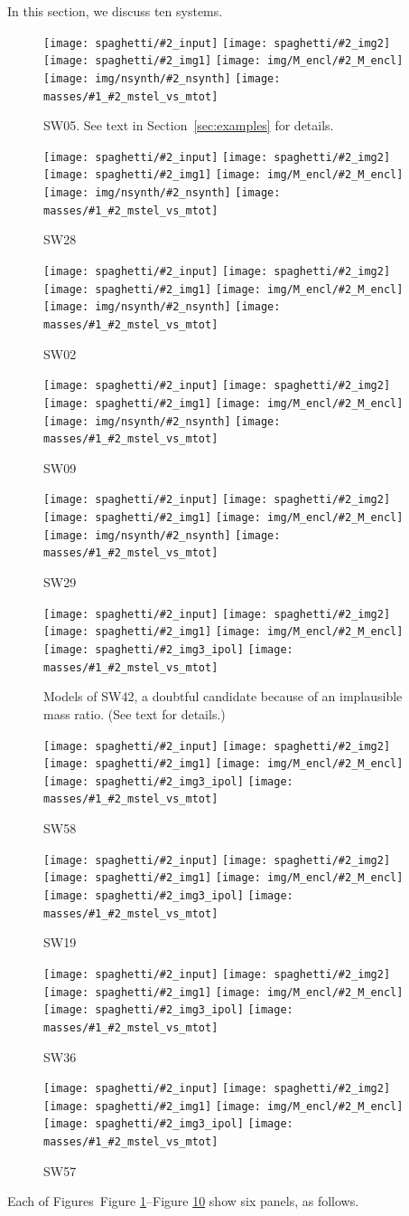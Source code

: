 \documentclass[fleqn,usenatbib]{mnras}
\newcommand{\inclfig}[2]{
  \centering
	\texttt{[image: spaghetti/\#2\_input]}%
	\texttt{[image: spaghetti/\#2\_img2]}
	\texttt{[image: spaghetti/\#2\_img1]}%
	\texttt{[image: img/M\_encl/\#2\_M\_encl]}
	\texttt{[image: spaghetti/\#2\_img3\_ipol]}%
	\texttt{[image: masses/\#1\_\#2\_mstel\_vs\_mtot]}
}
\newcommand{\inclfign}[2]{
  \centering
	\texttt{[image: spaghetti/\#2\_input]}%
	\texttt{[image: spaghetti/\#2\_img2]}
	\texttt{[image: spaghetti/\#2\_img1]}%
	\texttt{[image: img/M\_encl/\#2\_M\_encl]}
	\texttt{[image: img/nsynth/\#2\_nsynth]}%
	\texttt{[image: masses/\#1\_\#2\_mstel\_vs\_mtot]}
}
\newcommand{\figref}[1]{Figure \ref{fig:#1}}
\begin{document}
In this section, we discuss ten systems.

\begin{figure}
  \inclfign{SW05}{ASW0007k4r_AJIBCHQ6EM}
  \caption{SW05.  See text in Section~\ref{sec:examples} for details.}
  \label{fig:SW05}
\end{figure}

\begin{figure}
  \inclfign{SW28}{ASW0007xrs_JHC3J2HYV7}
  \caption{SW28}
  \label{fig:SW28}
\end{figure}

\begin{figure}
  \inclfign{SW02}{ASW000619d_011489}
  \caption{SW02}
  \label{fig:SW02}
\end{figure}

\begin{figure}
  \inclfign{SW09}{ASW0002asp_5EKMWWVJHL}
  \caption{SW09}
  \label{fig:SW09}
\end{figure}

\begin{figure}
  \inclfign{SW29}{ASW0008qsm_TOFS7JNGEK}
  \caption{SW29}
  \label{fig:SW29}
\end{figure}

\begin{figure}
  \inclfig{SW42}{ASW00096rm_4Q3YCEWGLN}
  \caption{Models of SW42, a doubtful candidate because of an
    implausible mass ratio. (See text for details.)}
  \label{fig:SW42}
\end{figure}

\begin{figure}
  \inclfig{SW58}{ASW0007iwp_4XBJWT3COV}
  \caption{SW58}
  \label{fig:SW58}
\end{figure}

\begin{figure}
  \inclfig{SW19}{ASW0001ld7_OS3CYAKLRT}
  \caption{SW19}
  \label{fig:SW19}
\end{figure}


\begin{figure}
  \inclfig{SW36}{ASW000096t_7IPP7LWVOF}
  \caption{SW36}
  \label{fig:SW36}
\end{figure}

\begin{figure}
  \inclfig{SW57}{ASW0008pag_5SXGXQYY6V}
  \caption{SW57}
  \label{fig:SW57}
\end{figure}

Each of Figures~\figref{SW05}--\figref{SW57} show six panels, as
follows.
\end{document}
